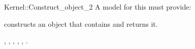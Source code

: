\begin{ccRefFunctionObjectConcept}{Kernel::Construct_object_2}
A model for this must provide:


{constructs an object that contains  and returns it.}

\ccSeeAlso
{},
,
,
,
,
.

\ccIsModel{}

\end{ccRefFunctionObjectConcept}
